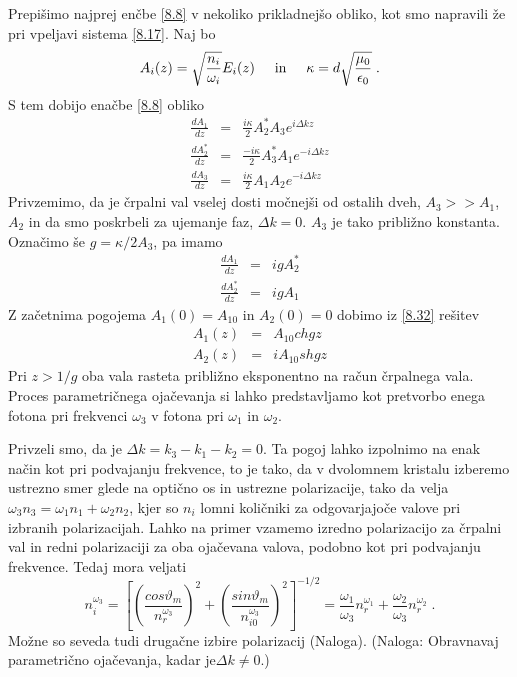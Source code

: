 Prepišimo najprej enčbe \ref{8.8} v nekoliko prikladnejšo obliko,
kot smo napravili že pri vpeljavi sistema \ref{8.17}. Naj bo 
\begin{equation}
A_{i}(z)=\sqrt{\frac{n_{i}}{\omega_{i}}}E_{i}(z)\hskip0.5cm\mbox{in}
\hskip0.5cm\kappa=d\sqrt{\frac{\mu_{0}}{\epsilon_{0}}}\;.\label{8.30}
\end{equation}
 S tem dobijo enačbe \ref{8.8} obliko 
\begin{eqnarray}
\frac{dA_{1}}{dz} & = & \frac{i\kappa}{2}A_{2}^{\ast}A_{3}e^{i\Delta kz}\nonumber \\
\frac{dA_{2}^{\ast}}{dz} & = & \frac{-i\kappa}{2}A_{3}^{\ast}A_{1}e^{-i\Delta kz}\nonumber \\
\frac{dA_{3}}{dz} & = & \frac{i\kappa}{2}A_{1}A_{2}e^{-i\Delta kz}
\end{eqnarray}
 Privzemimo, da je črpalni val vselej dosti močnejši od ostalih dveh,
$A_{3}>>A_{1}$, $A_{2}$ in da smo poskrbeli za ujemanje faz, $\Delta k=0$.
$A_{3}$ je tako približno konstanta. Označimo še $g=\kappa/2A_{3}$,
pa imamo 
\begin{eqnarray}
\frac{dA_{1}}{dz} & = & igA_{2}^{\ast}\nonumber \\
\frac{dA_{2}^{\ast}}{dz} & = & igA_{1}
\end{eqnarray}
 Z začetnima pogojema $A_{1}(0)=A_{10}$ in $A_{2}(0)=0$ dobimo iz
\ref{8.32} rešitev 
\begin{eqnarray}
A_{1}(z) & = & A_{10}chgz\nonumber \\
A_{2}(z) & = & iA_{10}shgz
\end{eqnarray}
 Pri $z>1/g$ oba vala rasteta približno eksponentno na račun črpalnega
vala. Proces parametričnega ojačevanja si lahko predstavljamo kot
pretvorbo enega fotona pri frekvenci $\omega_{3}$ v fotona pri $\omega_{1}$
in $\omega_{2}$.

Privzeli smo, da je $\Delta k=k_{3}-k_{1}-k_{2}=0$. Ta pogoj lahko
izpolnimo na enak način kot pri podvajanju frekvence, to je tako,
da v dvolomnem kristalu izberemo ustrezno smer glede na optično os
in ustrezne polarizacije, tako da velja $\omega_{3}n_{3}=\omega_{1}n_{1}+\omega_{2}n_{2}$,
kjer so $n_{i}$ lomni količniki za odgovarjajoče valove pri izbranih
polarizacijah. Lahko na primer vzamemo izredno polarizacijo za črpalni
val in redni polarizaciji za oba ojačevana valova, podobno kot pri
podvajanju frekvence. Tedaj mora veljati 
\begin{equation}
n_{i}^{\omega_{3}}=\left[\left(\frac{cos\vartheta_{m}}{n_{r}^{\omega_{3}}}\right)^{2}
+\left(\frac{sin\vartheta_{m}}{n_{i0}^{\omega_{3}}}\right)^{2}\right]^{-1/2}=
\frac{\omega_{1}}{\omega_{3}}n_{r}^{\omega_{1}}+\frac{\omega_{2}}{\omega_{3}}n_{r}^{\omega_{2}}\;.\label{8.34}
\end{equation}
 Možne so seveda tudi drugačne izbire polarizacij (Naloga). (Naloga:
Obravnavaj parametrično ojačevanja, kadar je$\Delta k\neq0$.)

